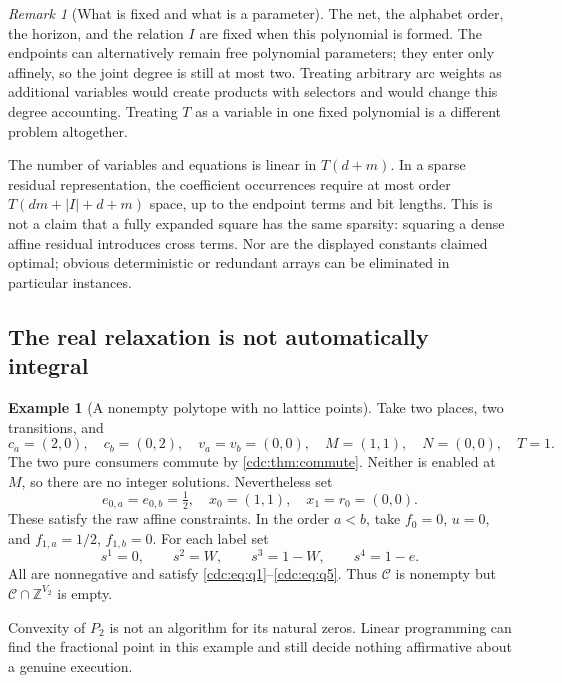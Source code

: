 \documentclass[11pt,a4paper]{article}
\theoremstyle{definition}
\newtheorem{example}[example]{Example}
\theoremstyle{remark}
\newtheorem{remark}[remark]{Remark}
\newcommand{\Z}{\mathbb Z}
\begin{document}
\begin{remark}[What is fixed and what is a parameter]
The net, the alphabet order, the horizon, and the relation $I$ are fixed when this polynomial is formed. The endpoints can alternatively remain free polynomial parameters; they enter only affinely, so the joint degree is still at most two. Treating arbitrary arc weights as additional variables would create products with selectors and would change this degree accounting. Treating $T$ as a variable in one fixed polynomial is a different problem altogether.
\end{remark}

The number of variables and equations is linear in $T(d+m)$. In a sparse residual representation, the coefficient occurrences require at most order
$T(dm+|I|+d+m)$ space, up to the endpoint terms and bit lengths. This is not a claim that a fully expanded square has the same sparsity: squaring a dense affine residual introduces cross terms. Nor are the displayed constants claimed optimal; obvious deterministic or redundant arrays can be eliminated in particular instances.

\subsection{The real relaxation is not automatically integral}
\begin{example}[A nonempty polytope with no lattice points]\label{cdc:ex:gap}
Take two places, two transitions, and
\[
c_a=(2,0),\quad c_b=(0,2),\quad v_a=v_b=(0,0),
\quad M=(1,1),\quad N=(0,0),\quad T=1.
\]
The two pure consumers commute by \cref{cdc:thm:commute}. Neither is enabled at $M$, so there are no integer solutions. Nevertheless set
\[
e_{0,a}=e_{0,b}=\tfrac12,\quad x_0=(1,1),
\quad x_1=r_0=(0,0).
\]
These satisfy the raw affine constraints. In the order $a<b$, take $f_0=0$, $u=0$, and $f_{1,a}=1/2$, $f_{1,b}=0$. For each label set
\[
s^1=0,\qquad s^2=W,\qquad s^3=1-W,\qquad s^4=1-e.
\]
All are nonnegative and satisfy \eqref{cdc:eq:q1}--\eqref{cdc:eq:q5}. Thus $\mathcal C$ is nonempty but $\mathcal C\cap\Z^{V_2}$ is empty.
\end{example}

Convexity of $P_2$ is not an algorithm for its natural zeros. Linear programming can find the fractional point in this example and still decide nothing affirmative about a genuine execution.
\end{document}
